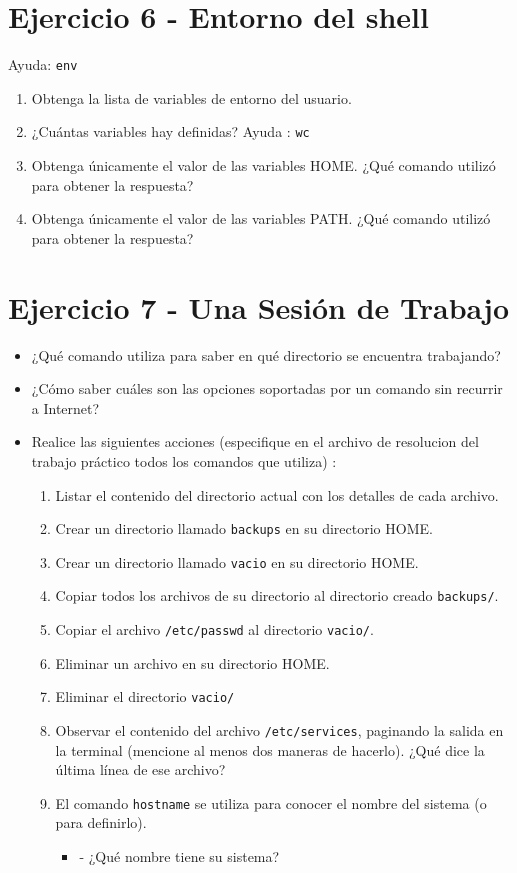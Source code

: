 \documentclass[12pt]{article}
\begin{document}
\section*{Ejercicio 6 - Entorno del shell}
Ayuda: \texttt{env}
\begin{enumerate}
\item Obtenga la lista de variables de entorno del usuario.
\item ¿Cuántas variables hay definidas? Ayuda : \texttt{wc}
\item Obtenga únicamente el valor de las variables HOME. ¿Qué comando utilizó para obtener la respuesta?
\item Obtenga únicamente el valor de las variables PATH. ¿Qué comando utilizó para obtener la respuesta?
\end{enumerate}


\section*{Ejercicio 7 - Una Sesión de Trabajo}

\begin{itemize}
\item ¿Qué comando utiliza para saber en qué directorio se encuentra trabajando?
\item ¿Cómo saber cuáles son las opciones soportadas por un comando sin recurrir a Internet?

\item Realice las siguientes acciones (especifique en el archivo de resolucion del trabajo práctico todos los comandos que utiliza) : 
	\begin{enumerate}
	\item Listar el contenido del directorio actual con los detalles de cada archivo. 
	\item Crear un directorio llamado \texttt{backups} en su directorio HOME.
	\item Crear un directorio llamado \texttt{vacio} en su directorio HOME.
	\item Copiar todos los archivos de su directorio al directorio creado \texttt{backups/}.
	\item Copiar el archivo \texttt{/etc/passwd} al directorio \texttt{vacio/}.
	\item Eliminar un archivo en su directorio HOME.
	\item Eliminar el directorio \texttt{vacio/}
	\item Observar el contenido del archivo \texttt{/etc/services}, paginando la salida en la terminal (mencione al menos dos maneras de hacerlo). ¿Qué dice la última línea de ese archivo?
\item El comando \texttt{hostname} se utiliza para conocer el nombre del sistema (o para definirlo).
\begin{itemize}
\item - ¿Qué nombre tiene su sistema?
\end{itemize}
	\end{enumerate}
\end{itemize}
 
\end{document}
